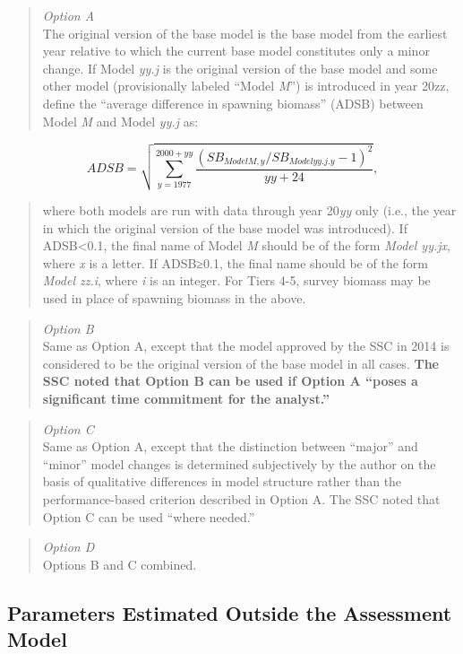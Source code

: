 \documentclass[
  11pt,
]{article}
\begin{document}
\begin{quote}
\emph{Option A}\\
The original version of the base model is the base model from the earliest year relative to which the current base model constitutes only a minor change.
If Model \emph{yy.j} is the original version of the base model and some other model (provisionally labeled ``Model \emph{M}'') is introduced in year 20zz, define the ``average difference in spawning biomass'' (ADSB) between Model \emph{M} and Model \emph{yy.j} as:
\end{quote}

\[ ADSB = \sqrt{\sum^{2000+yy}_{y=1977}\frac{(SB_{Model M,y} / SB_{Model yy.j.y} - 1)^2}{yy + 24}}, \]

\begin{quote}
where both models are run with data through year 20\emph{yy} only (i.e., the year in which the original version of the base model was introduced). If ADSB\textless0.1, the final name of Model \emph{M} should be of the form \emph{Model yy.jx}, where \emph{x} is a letter. If ADSB≥0.1, the final name should be of the form \emph{Model zz.i}, where \emph{i} is an integer. For Tiers 4-5, survey biomass may be used in place of spawning biomass in the above.
\end{quote}

\begin{quote}
\emph{Option B}\\
Same as Option A, except that the model approved by the SSC in 2014 is considered to be the original version of the base model in all cases. \textbf{The SSC noted that Option B can be used if Option A ``poses a significant time commitment for the analyst.''}
\end{quote}

\begin{quote}
\emph{Option C}\\
Same as Option A, except that the distinction between ``major'' and ``minor'' model changes is determined subjectively by the author on the basis of qualitative differences in model structure rather than the performance-based criterion described in Option A. The SSC noted that Option C can be used ``where needed.''
\end{quote}

\begin{quote}
\emph{Option D}\\
Options B and C combined.
\end{quote}

\hypertarget{parameters-estimated-outside-the-assessment-model}{%
\subsection{Parameters Estimated Outside the Assessment Model}\label{parameters-estimated-outside-the-assessment-model}}
\end{document}
